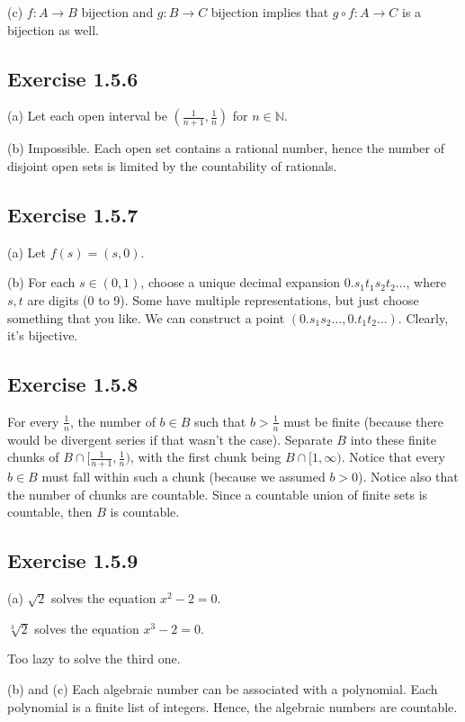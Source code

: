 \documentclass{book}
\begin{document}
\noindent
(c)
$f: A \rightarrow B$ bijection and $g: B \rightarrow C$ bijection implies that $g \circ f: A \rightarrow C$ is a bijection as well.

\subsection*{Exercise 1.5.6}
(a)
Let each open interval be $\left(\frac{1}{n + 1}, \frac{1}{n}\right)$ for $n \in \mathbb{N}$.

\noindent
(b)
Impossible. Each open set contains a rational number, hence the number of disjoint open sets is limited by the countability of rationals.

\subsection*{Exercise 1.5.7}
(a)
Let $f(s) = (s, 0)$.

\noindent
(b)
For each $s \in (0, 1)$, choose a unique decimal expansion $0.s_1t_1s_2t_2\ldots$, where $s, t$ are digits (0 to 9). Some have multiple representations, but just choose something that you like. We can construct a point $(0.s_1s_2\ldots, 0.t_1t_2\ldots)$. Clearly, it's bijective.

\subsection*{Exercise 1.5.8}
For every $\frac{1}{n}$, the number of $b \in B$ such that $b > \frac{1}{n}$ must be finite (because there would be divergent series if that wasn't the case). Separate $B$ into these finite chunks of $B \cap [\frac{1}{n + 1}, \frac{1}{n})$, with the first chunk being $B \cap [1, \infty)$. Notice that every $b \in B$ must fall within such a chunk (because we assumed $b > 0$). Notice also that the number of chunks are countable. Since a countable union of finite sets is countable, then $B$ is countable.

\subsection*{Exercise 1.5.9}
(a)
$\sqrt{2}$ solves the equation $x^2 - 2 = 0$.

\noindent
$\sqrt[3]{2}$ solves the equation $x^3 - 2 = 0$.

\noindent
Too lazy to solve the third one.

\noindent
(b) and (c)
Each algebraic number can be associated with a polynomial. Each polynomial is a finite list of integers. Hence, the algebraic numbers are countable.
\end{document}
